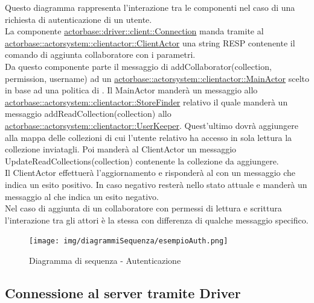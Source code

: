\documentclass{scalatekids-article}
\begin{document}
Questo diagramma rappresenta l'interazione tra le componenti nel caso di una richiesta di autenticazione di un utente.\\
La componente \hyperref[sec:actorbase::driver::client::Connection]{actorbase::driver::client::Connection} 
manda tramite  al \hyperref[sec:actorbase::actorsystem::clientactor::ClientActor]{actorbase::actorsystem::clientactor::ClientActor} 
una string RESP contenente il comando di aggiunta collaboratore  con 
i parametri.\\ %
Da questo componente parte il messaggio di addCollaborator(collection, permission, username) ad un \hyperref[sec:actorbase::actorsystem::clientactor::MainActor]{actorbase::actorsystem::clientactor::MainActor} scelto in base ad una 
politica di . Il MainActor manderà un messaggio allo 
\hyperref[sec:actorbase::actorsystem::clientactor::StoreFinder]{actorbase::actorsystem::clientactor::StoreFinder} 
relativo il quale manderà un messaggio addReadCollection(collection) allo 
\hyperref[sec:actorbase::actorsystem::clientactor::UserKeeper]{actorbase::actorsystem::clientactor::UserKeeper}. 
Quest'ultimo dovrà aggiungere alla mappa delle collezioni di cui l'utente 
relativo ha accesso in sola lettura la collezione inviatagli. 
Poi manderà al ClientActor un messaggio UpdateReadCollections(collection) 
contenente la collezione da aggiungere.\\
Il ClientActor effettuerà l'aggiornamento e risponderà al  
con un messaggio che indica un esito positivo. In caso negativo resterà nello 
stato attuale e manderà un messaggio al  che indica un esito 
negativo.\\
Nel caso di aggiunta di un collaboratore con permessi di lettura e scrittura 
l'interazione tra gli attori è la stessa con differenza di qualche messaggio 
specifico.\\
\begin{figure}[H]
  \begin{center}
    \texttt{[image: img/diagrammiSequenza/esempioAuth.png]}
    \caption{Diagramma di sequenza - Autenticazione}
  \end{center}
\end{figure}

\subsection{Connessione al server tramite Driver}
\end{document}

